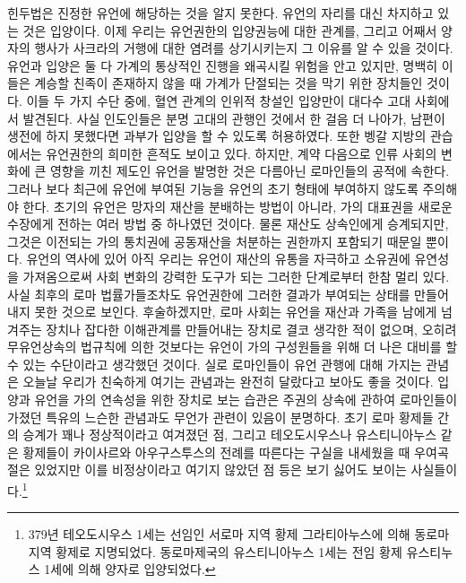 힌두법은 진정한 유언에 해당하는 것을 알지 못한다.
유언의 자리를 대신 차지하고 있는 것은 입양이다.
이제 우리는 유언권한의 입양권능에 대한 관계를,
그리고 어째서 양자의 행사가 사크라의 거행에 대한 염려를 상기시키는지 그 이유를
알 수 있을 것이다.
유언과 입양은 둘 다 가계의 통상적인 진행을 왜곡시킬
위험을 안고 있지만, 명백히 이들은
계승할 친족이 존재하지 않을 때 가계가 단절되는 것을 막기 위한
장치들인 것이다.
이들 두 가지 수단 중에,
혈연 관계의 인위적 창설인
입양만이
대다수 고대 사회에서 발견된다.
사실 인도인들은 분명 고대의 관행인 것에서 한 걸음 더 나아가,
남편이 생전에 하지 못했다면 과부가 입양을 할 수 있도록 허용하였다.
또한 벵갈 지방의 관습에서는 유언권한의 희미한 흔적도 보이고 있다.
하지만,
계약 다음으로 인류 사회의 변화에 큰 영향을 끼친 제도인
유언을 발명한 것은 다름아닌 로마인들의 공적에 속한다.
그러나
보다 최근에 유언에 부여된 기능을
유언의 초기 형태에 부여하지 않도록 주의해야 한다.
초기의 유언은 망자의 재산을 분배하는 방법이 아니라,
가의 대표권을 새로운 수장에게 전하는 여러 방법 중 하나였던 것이다.
물론 재산도 상속인에게 승계되지만,
그것은 이전되는 가의 통치권에
공동재산을 처분하는 권한까지 포함되기 때문일 뿐이다.
유언의 역사에 있어
아직 우리는
유언이
재산의 유통을 자극하고
소유권에 유연성을 가져옴으로써
사회 변화의
강력한 도구가 되는 그러한 단계로부터 한참 멀리 있다.
사실 최후의 로마 법률가들조차도
유언권한에 그러한 결과가 부여되는 상태를 만들어내지 못한 것으로 보인다.
후술하겠지만,
로마 사회는 유언을
재산과 가족을 남에게 넘겨주는 장치나
잡다한 이해관계를 만들어내는 장치로
결코 생각한 적이 없으며, 오히려
무유언상속의 법규칙에 의한 것보다는 유언이
가의 구성원들을 위해 더 나은 대비를 할 수 있는 수단이라고
생각했던 것이다.
실로 로마인들이 유언 관행에 대해 가지는 관념은
오늘날 우리가 친숙하게 여기는 관념과는 완전히 달랐다고 보아도 좋을 것이다.
입양과 유언을 가의 연속성을 위한 장치로 보는 습관은
주권의 상속에 관하여 로마인들이 가졌던 특유의 느슨한 관념과도
무언가 관련이 있음이 분명하다.
초기 로마 황제들 간의 승계가 꽤나 정상적이라고 여겨졌던 점,
그리고 테오도시우스나
유스티니아누스 같은 황제들이 카이사르와 아우구스투스의 전례를
따른다는 구실을 내세웠을 때
우여곡절은 있었지만
이를 비정상이라고 여기지 않았던 점 등은
보기 싫어도 보이는 사실들이다.\footnote{%
  379년 테오도시우스 1세는 선임인 서로마 지역 황제 그라티아누스에 의해
  동로마 지역 황제로 지명되었다.
  동로마제국의 유스티니아누스 1세는 전임 황제 유스티누스 1세에 의해
  양자로 입양되었다.}

